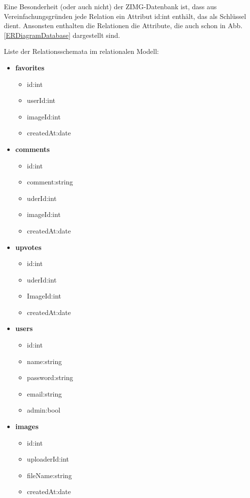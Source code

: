 \documentclass[12pt, oneside, a4paper]{article}		%
\begin{document}
Eine Besonderheit (oder auch nicht) der ZIMG-Datenbank ist, dass aus Vereinfachungsgründen jede Relation ein Attribut id:int enthält, das als Schlüssel dient. Ansonsten enthalten die Relationen die Attribute, die auch schon in Abb. \ref{ERDiagramDatabase} dargestellt sind.

Liste der Relationsschemata im relationalen Modell:

\begin{itemize}
	\item \textbf{favorites}
	\begin{itemize}
		\item id:int
		\item userId:int
		\item imageId:int
		\item createdAt:date
	\end{itemize}
	\item \textbf{comments}
	\begin{itemize}
		\item id:int
		\item comment:string
		\item uderId:int
		\item imageId:int
		\item createdAt:date
	\end{itemize}
	\item \textbf{upvotes}
	\begin{itemize}
		\item id:int
		\item uderId:int
		\item ImageId:int
		\item createdAt:date
	\end{itemize}
	\item \textbf{users}
	\begin{itemize}
		\item id:int
		\item name:string
		\item password:string
		\item email:string
		\item admin:bool
	\end{itemize}
	\item \textbf{images}
	\begin{itemize}
		\item id:int
		\item uploaderId:int
		\item fileName:string
		\item createdAt:date

\end{itemize}
\end{itemize}
\end{document}
